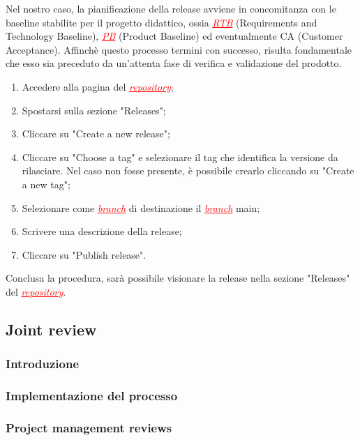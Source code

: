 Nel nostro caso, la pianificazione della release avviene in concomitanza con le baseline stabilite per il progetto didattico, ossia 
\textcolor{red}{\uline{\textit{RTB}}} (Requirements and Technology Baseline), 
\textcolor{red}{\uline{\textit{PB}}} (Product Baseline) ed eventualmente CA (Customer Acceptance).
Affinchè questo processo termini con successo, risulta fondamentale che esso sia preceduto da un'attenta fase di verifica e validazione del prodotto.

\begin{enumerate}
    \item Accedere alla pagina del \textcolor{red}{\uline{\textit{repository}}};
    \item Spostarsi sulla sezione "Releases";
    \item Cliccare su "Create a new release";
    \item Cliccare su "Choose a tag" e selezionare il tag che identifica la versione da rilasciare. Nel caso non fosse presente, è possibile
    crearlo cliccando su "Create a new tag";
    \item Selezionare come \textcolor{red}{\uline{\textit{branch}}} di destinazione il \textcolor{red}{\uline{\textit{branch}}} main;
    \item Scrivere una descrizione della release;
    \item Cliccare su "Publish release".
\end{enumerate}
Conclusa la procedura, sarà possibile visionare la release nella sezione "Releases" del \textcolor{red}{\uline{\textit{repository}}}.

\subsection{Joint review}
\subsubsection{Introduzione}
\subsubsection{Implementazione del processo}
\subsubsection{Project management reviews}
